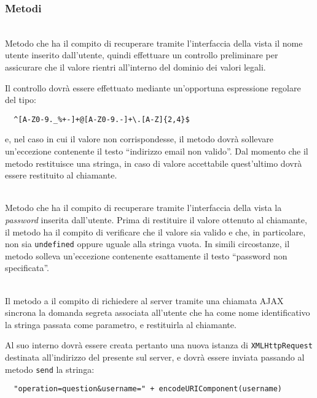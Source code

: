 \subsubsection*{Metodi}
\begin{description}

\item{}\\
Metodo che ha il compito di recuperare tramite l'interfaccia della vista il nome utente inserito dall'utente, quindi effettuare un controllo preliminare per assicurare che il valore rientri all'interno del dominio dei valori legali.

Il controllo dovrà essere effettuato mediante un'opportuna espressione regolare del tipo:
\begin{verbatim}
  ^[A-Z0-9._%+-]+@[A-Z0-9.-]+\.[A-Z]{2,4}$
\end{verbatim}
e, nel caso in cui il valore non corrispondesse, il metodo dovrà sollevare un'eccezione contenente il testo ``indirizzo email non valido''. Dal momento che il metodo restituisce una stringa, in caso di valore accettabile quest'ultimo dovrà essere restituito al chiamante.

\item{}\\
Metodo che ha il compito di recuperare tramite l'interfaccia della vista la \textit{password} inserita dall'utente. Prima di restituire il valore ottenuto al chiamante, il metodo ha il compito di verificare che il valore sia valido e che, in particolare, non sia \verb+undefined+ oppure uguale alla stringa vuota. In simili circostanze, il metodo solleva un'eccezione contenente esattamente il testo ``password non specificata''.

\item{}\\
Il metodo a il compito di richiedere al server tramite una chiamata AJAX sincrona la domanda segreta associata all'utente che ha come nome identificativo la stringa passata come parametro, e restituirla al chiamante.

Al suo interno dovrà essere creata pertanto una nuova istanza di \verb+XMLHttpRequest+ destinata all'indirizzo del  presente sul server, e dovrà essere inviata  passando al metodo \verb+send+ la stringa:
\begin{verbatim}
  "operation=question&username=" + encodeURIComponent(username)
\end{verbatim}


\end{description}
